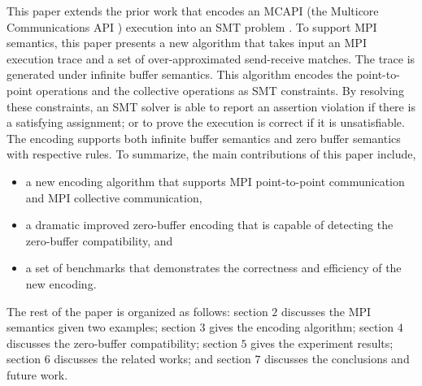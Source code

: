 This paper extends the prior work that encodes an MCAPI (the Multicore Communications API \cite{mcapi}) execution into an SMT problem \cite{DBLP:conf/kbse/HuangMM13}. To support MPI semantics, this paper presents a new algorithm that takes input an MPI execution trace and a set of over-approximated send-receive matches. The trace is generated under infinite buffer semantics. This algorithm encodes the point-to-point operations and the collective operations as SMT constraints. By resolving these constraints, an SMT solver is able to report an assertion violation if there is a satisfying assignment; or to prove the execution is correct if it is unsatisfiable. The encoding supports both infinite buffer semantics and zero buffer semantics with respective rules. To summarize, the main contributions of this paper include,
\begin{itemize}
\item a new encoding algorithm that supports MPI point-to-point communication and MPI collective communication,
\item a dramatic improved zero-buffer encoding that is capable of detecting the zero-buffer compatibility, and
\item a set of benchmarks that demonstrates the correctness and efficiency of the new encoding.
\end{itemize}

The rest of the paper is organized as follows: section $2$ discusses the MPI semantics given two examples; section $3$ gives the encoding algorithm; section $4$ discusses the zero-buffer compatibility; section $5$ gives the experiment results; section $6$ discusses the related works; and section $7$ discusses the conclusions and future work.

\examplefigone


           